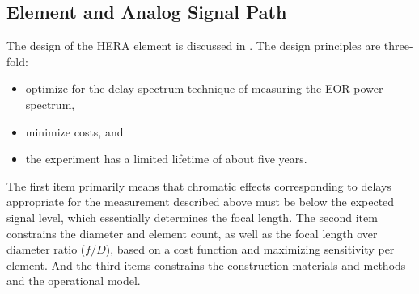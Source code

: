 \documentclass{article}
\begin{document}



\subsection{Element and Analog Signal Path}
\label{sec:element}
The design of the HERA element is discussed in \cite{heraMemo5}.  The design principles are three-fold:
\begin{itemize}
\item optimize for the delay-spectrum technique of measuring the EOR power spectrum,
\item minimize costs, and
\item the experiment has a limited lifetime of about five years.
\end{itemize}
The first item primarily means that chromatic effects corresponding to delays appropriate for the measurement described above must be below the expected signal level, which essentially determines the focal length.  The second item constrains the diameter and element count, as well as the focal length over diameter ratio ($f/D$), based on a cost function and maximizing sensitivity per element.  And the third items constrains the construction materials and methods and the operational model.
\end{document}
